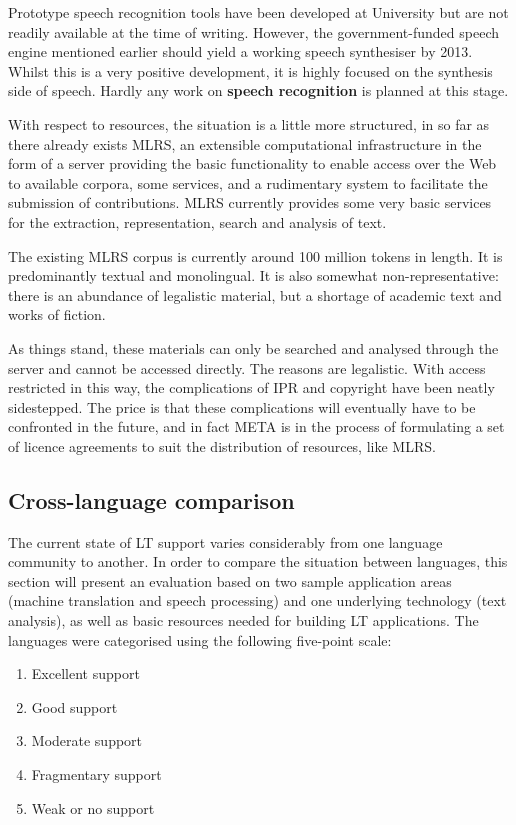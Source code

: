\begin{multicols}{2}
Prototype speech recognition tools have been developed at University but are not readily available at the time of writing. However, the government-funded speech engine mentioned earlier should yield a working speech synthesiser by 2013. Whilst this is a very positive development, it is highly focused on the synthesis side of speech. Hardly any work on \textbf{speech recognition} is planned at this stage.

With respect to resources, the situation is a little more structured, in so far as there already exists MLRS, an extensible computational infrastructure in the form of a server providing the basic functionality to enable access over the Web to available corpora, some services, and a rudimentary system to facilitate the submission of contributions. MLRS currently provides some very basic services for the extraction, representation, search and analysis of text.

The existing MLRS corpus is currently around 100 million tokens in length. It is predominantly textual and monolingual. It is also somewhat non-representative: there is an abundance of legalistic material, but a shortage of academic text and works of fiction.

As things stand, these materials can only be searched and analysed through the server and cannot be accessed directly. The reasons are legalistic. With access restricted in this way, the complications of IPR and copyright have been neatly sidestepped. The price is that these complications will eventually have to be confronted in the future, and in fact META is in the process of formulating a set of licence agreements to suit the distribution of resources, like MLRS.


\subsection{Cross-language comparison}

The current state of LT support varies considerably from one language community to another. In order to compare the situation between languages, this section will present an evaluation based on two sample application areas (machine translation and speech processing) and one underlying technology (text analysis), as well as basic resources needed for building LT applications. The languages were categorised using the following five-point scale: 

\begin{enumerate}
\item Excellent support
\item Good support
\item Moderate support
\item Fragmentary support
\item Weak or no support
\end{enumerate}


\end{multicols}
